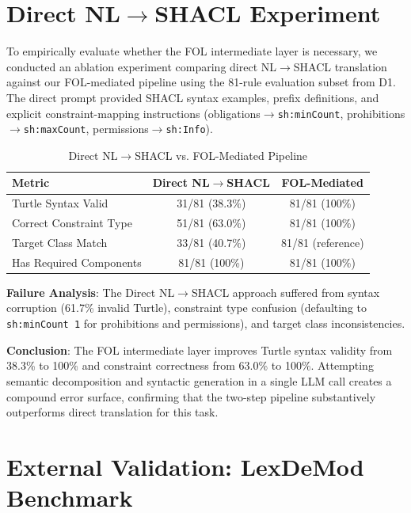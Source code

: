 \section{Direct NL$\rightarrow$SHACL Experiment}
\label{sec:direct-shacl-experiment}

To empirically evaluate whether the FOL intermediate layer is necessary, we conducted an ablation experiment comparing direct NL$\rightarrow$SHACL translation against our FOL-mediated pipeline using the 81-rule evaluation subset from D1. The direct prompt provided SHACL syntax examples, prefix definitions, and explicit constraint-mapping instructions (obligations$\rightarrow$\texttt{sh:minCount}, prohibitions$\rightarrow$\texttt{sh:maxCount}, permissions$\rightarrow$\texttt{sh:Info}). 

\begin{table}[htbp]
\centering
\caption{Direct NL$\rightarrow$SHACL vs. FOL-Mediated Pipeline}
\label{tab:direct-vs-fol}
\begin{tabular}{lcc}
\toprule
\textbf{Metric} & \textbf{Direct NL$\rightarrow$SHACL} & \textbf{FOL-Mediated} \\
\midrule
Turtle Syntax Valid        & 31/81 (38.3\%) & 81/81 (100\%) \\
Correct Constraint Type    & 51/81 (63.0\%) & 81/81 (100\%) \\
Target Class Match         & 33/81 (40.7\%) & 81/81 (reference) \\
Has Required Components    & 81/81 (100\%)  & 81/81 (100\%) \\
\bottomrule
\end{tabular}
\end{table}

\textbf{Failure Analysis}: The Direct NL$\rightarrow$SHACL approach suffered from syntax corruption (61.7\% invalid Turtle), constraint type confusion (defaulting to \texttt{sh:minCount 1} for prohibitions and permissions), and target class inconsistencies. 

\textbf{Conclusion}: The FOL intermediate layer improves Turtle syntax validity from 38.3\% to 100\% and constraint correctness from 63.0\% to 100\%. Attempting semantic decomposition and syntactic generation in a single LLM call creates a compound error surface, confirming that the two-step pipeline substantively outperforms direct translation for this task.

\section{External Validation: LexDeMod Benchmark}
\label{sec:lexdemod-validation}


